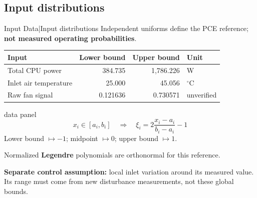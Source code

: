 \subsection{Input distributions}

\begin{frame}{Input Data\enspace|\enspace Input distributions}
  \small
  Independent uniforms define the PCE reference; \textbf{not measured operating probabilities}.
  \par\medskip
  {\renewcommand{\arraystretch}{1.35}
  \begin{tabular*}{\textwidth}{@{\extracolsep{\fill}}lrrl@{}}
    \toprule
    \textbf{Input} & \textbf{Lower bound} & \textbf{Upper bound} & \textbf{Unit}\\
    \midrule
    Total CPU power & 384.735 & 1,786.226 & W\\
    Inlet air temperature & 25.000 & 45.056 & ${}^\circ$C\\
    Raw fan signal & 0.121636 & 0.730571 & unverified\\
    \bottomrule
  \end{tabular*}}
  \smallskip
  \begin{beamercolorbox}[sep=1.5mm,wd=\textwidth]{data panel}
    \footnotesize
    \setlength{\abovedisplayskip}{2pt}
    \setlength{\belowdisplayskip}{2pt}
    \[
      x_i\in[a_i,b_i]\quad\Longrightarrow\quad
      \xi_i=2\frac{x_i-a_i}{b_i-a_i}-1
    \]
    Lower bound $\mapsto-1$; midpoint $\mapsto0$; upper bound $\mapsto1$.\par
    Normalized \textbf{Legendre} polynomials are orthonormal for this reference.
  \end{beamercolorbox}
  \smallskip
  {\footnotesize \textbf{Separate control assumption:} local inlet variation around its measured value.
  Its range must come from new disturbance measurements, not these global bounds.}
\end{frame}
